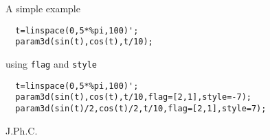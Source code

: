 \begin{examples}
\noindent A simple example
\begin{Verbatim}
  t=linspace(0,5*%pi,100)';
  param3d(sin(t),cos(t),t/10);
\end{Verbatim}
\noindent using \verb!flag! and \verb!style!

\begin{Verbatim}
  t=linspace(0,5*%pi,100)';
  param3d(sin(t),cos(t),t/10,flag=[2,1],style=-7);
  param3d(sin(t)/2,cos(t)/2,t/10,flag=[2,1],style=7);
\end{Verbatim}
\end{examples}

\begin{manseealso}
   
\end{manseealso}


\begin{authors}
  J.Ph.C.

\end{authors}
